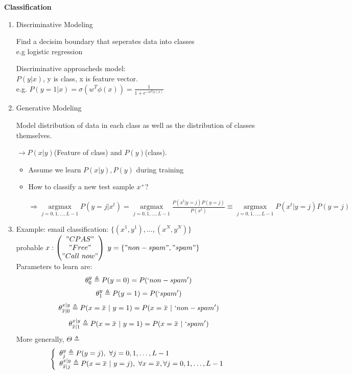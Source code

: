 \documentclass[12pt]{article}
\newcommand{\overbar}[1]{\mkern 1.5mu\overline{\mkern-1.5mu#1\mkern-1.5mu}\mkern 1.5mu}
\DeclareMathOperator*{\argmax}{\arg\max}
\begin{document}
        \textbf{Classification}
        \begin{enumerate}
            \item Discriminative Modeling
            
            Find a decisim boundary that seperates data into classes\\
            e.g logistic regression

            Discriminative approacheds model:\\
            $P(y | x)$, y is class, x is feature vector.\\
            e.g. $P(y = 1 | x) = \sigma(w^T\phi(x)) = \frac{1}{1 + e^{-w^T\phi(x)}}$
            \item Generative Modeling

            Model distribution of data in each class as well as the distribution of classes themselves.

            $\rightarrow P(x | y)$(Feature of class) and $P(y)$(class).

            \begin{itemize}
                \item Assume we learn $P(x | y), P(y)$ during training
                \item How to classify a new test sample $x^+$?
                
                $\Rightarrow \argmax\limits_{j = 0,1,\dots, L-1} P(y = j | x^t) = \argmax\limits_{j = 0,1,\dots, L-1} \frac{P(x^t | y = j)P(y = j)}{P(x^t)} \equiv \argmax\limits_{j = 0,1,\dots, L-1}P(x^t | y = j)P(y = j)$
            \end{itemize}

            \item Example: email classification: $\{(x^1, y^1), \dots, (x^N, y^N)\}$\\
            probable $x: \begin{pmatrix}
                "CPAS"\\ "Free" \\ "Call \ now"
            \end{pmatrix}$
            $y = \{"non-spam", "spam"\}$\\
            Parameters to learn are:
            $$\theta_0^y \triangleq P(y = 0) = P(`non-spam')$$
            $$\theta_1^y \triangleq P(y = 1) = P(`spam')$$
            $$\theta_{\overbar{x}|0}^{x|y} \triangleq P(x = \overbar{x} \ | \ y = 1) = P(x = \overbar{x} \ | \ `non-spam')$$
            $$\theta_{\overbar{x} | 1}^{x | y} \triangleq P(x = \overbar{x} \ | \ y = 1) = P(x = \overbar{x} \ | \ `spam')$$
            More generally,
            $\Theta \triangleq$
            \begin{equation}
            \left\{  
            \begin{array}{l}
                \theta_j^y\triangleq P(y = j), \ \forall j = 0,1,\dots, L-1  \\
                \theta_{\overbar{x}|j}^{x|y} \triangleq P(x = \overbar{x} \ | \ y = j), \ \forall x = \overbar{x}, \forall j = 0,1,\dots, L-1
            \end{array}
            \right.
            \end{equation}
            

\end{enumerate}
\end{document}
